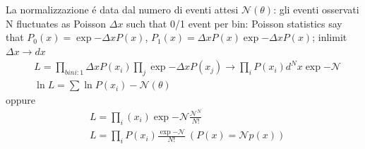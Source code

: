 \documentclass[asd-beamer.tex]{subfiles}
\begin{document}
\begin{frame}{}
La normalizzazione \'e data dal numero di eventi attesi $\mathcal{N}(\theta)$: gli eventi osservati N fluctuates as Poisson
$\Delta x$ such that 0/1 event per bin: Poisson statistics say that $P_0(x)=\exp{-\Delta xP(x)}$, $P_1(x)=\Delta xP(x)\exp{-\Delta xP(x)}$; inlimit $\Delta x\to dx$
\begin{align*}
&L=\prod_{bin i: 1}\Delta xP(x_i)\prod_j\exp{-\Delta xP(x_j)}\to\prod_iP(x_i)d^Nx\exp{-\mathcal{N}}\\
&\ln{L}=\sum\ln{P(x_i)}-\mathcal{N}(\theta)
\end{align*}
oppure
\begin{align*}
&L=\prod_i(x_i)\exp{-\mathcal{N}}\frac{\mathcal{N}^N}{N!}\\
&L=\prod_iP(x_i)\frac{\exp{-\mathcal{N}}}{N!}\ (P(x)=\mathcal{N}p(x))
\end{align*}
\end{frame}
\end{document}

